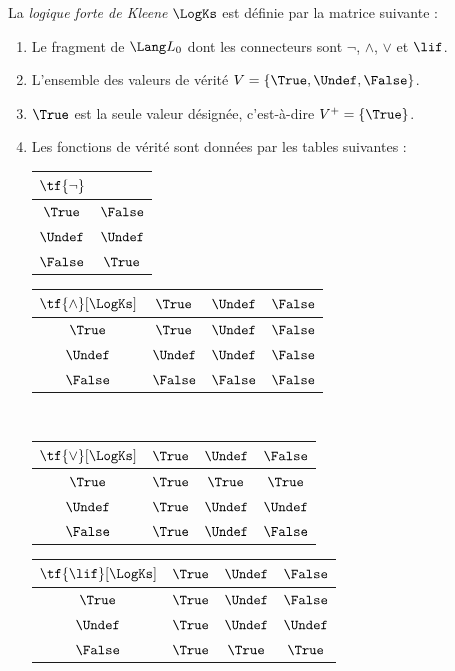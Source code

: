 \documentclass[../../../include/open-logic-section]{subfiles}
\begin{document}
\begin{defn}
La \emph{logique forte de Kleene}
$\LogKs$ est définie par la matrice
suivante :
\begin{enumerate}
  \item Le fragment de $\Lang L_0$ dont les connecteurs sont $\lnot$,
  $\land$, $\lor$ et $\lif$.
  \item L'ensemble des valeurs de vérité
  $V=\{\True,\Undef,\False\}$.
  \item $\True$ est la seule valeur
  désignée, c'est-à-dire
  $V^+=\{\True\}$.
  \item Les fonctions de vérité sont
  données par les tables suivantes :
  \begin{center}
    \begin{tabular}{c|c}
      $\tf{\lnot}$ & \\
      \hline
      $\True$ & $\False$ \\
      $\Undef$ & $\Undef$ \\
      $\False$ & $\True$
    \end{tabular}
    \quad
    \begin{tabular}{c|ccc}
      $\tf{\land}[\LogKs]$ & $\True$ & $\Undef$ & $\False$ \\
      \hline
      $\True$ & $\True$ & $\Undef$ & $\False$ \\
      $\Undef$ & $\Undef$ & $\Undef$ & $\False$ \\
      $\False$ & $\False$ & $\False$ & $\False$
    \end{tabular}
    \\[2ex]
    \begin{tabular}{c|ccc}
      $\tf{\lor}[\LogKs]$ & $\True$ & $\Undef$ & $\False$ \\
      \hline
      $\True$ & $\True$ & $\True$ & $\True$ \\
      $\Undef$ & $\True$ & $\Undef$ & $\Undef$ \\
      $\False$ & $\True$ & $\Undef$ & $\False$
    \end{tabular}
    \quad
    \begin{tabular}{c|ccc}
      $\tf{\lif}[\LogKs]$ & $\True$ & $\Undef$ & $\False$ \\
      \hline
      $\True$ & $\True$ & $\Undef$ & $\False$ \\
      $\Undef$ & $\True$ & $\Undef$ & $\Undef$ \\
      $\False$ & $\True$ & $\True$ & $\True$
    \end{tabular}
  \end{center}
\end{enumerate}
\end{defn}
\end{document}

